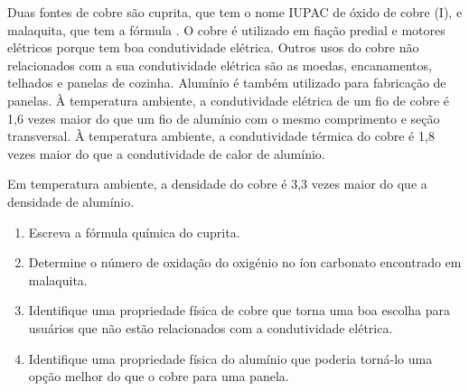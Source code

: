 Duas fontes de cobre são cuprita, que tem o nome IUPAC de óxido de cobre (I), e malaquita, que tem a fórmula .
O cobre é utilizado em fiação predial e motores elétricos porque tem boa condutividade elétrica.
Outros usos do cobre não relacionados com a sua condutividade elétrica são as moedas, encanamentos, telhados e panelas de cozinha.
Alumínio é também utilizado para fabricação de panelas.
À temperatura ambiente, a condutividade elétrica de um fio de cobre é 1,6 vezes maior do que um fio de alumínio com o mesmo comprimento e seção transversal.
À temperatura ambiente, a condutividade térmica do cobre é 1,8 vezes maior do que a condutividade de calor de alumínio.

Em temperatura ambiente, a densidade do cobre é 3,3 vezes maior do que a densidade de alumínio.

\begin{enumerate}[label = (\alph*)]
	\item Escreva a fórmula química do cuprita.
	\item Determine o número de oxidação do oxigénio no íon carbonato encontrado em malaquita.
	\item Identifique uma propriedade física de cobre que torna uma boa escolha para usuários que não estão relacionados com a condutividade elétrica.
	\item Identifique uma propriedade física do alumínio que poderia torná-lo uma opção melhor do que o cobre para uma panela.
\end{enumerate}
